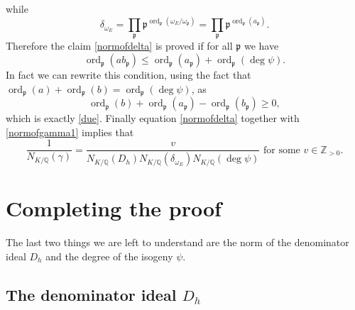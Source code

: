 \documentclass[11pt]{amsart}
\theoremstyle{definition}
\begin{document}
		while
		$$\delta_{\omega_E}=\prod_{\mathfrak{p}}{\mathfrak{p}}^{\operatorname{ord}_{\mathfrak{p}}(\omega_E/\omega_{\mathfrak{p}})}=\prod_{\mathfrak{p}}{\mathfrak{p}}^{\operatorname{ord}_{\mathfrak{p}}(a_{\mathfrak{p}})}.$$
		Therefore the claim \eqref{normofdelta} is proved if for all ${\mathfrak{p}}$ we have
		$$\operatorname{ord}_{\mathfrak{p}}(ab_{\mathfrak{p}})\leq\operatorname{ord}_{\mathfrak{p}}(a_{\mathfrak{p}})+\operatorname{ord}_{\mathfrak{p}}(\deg\psi).$$
		In fact we can rewrite this condition, using the fact that $\operatorname{ord}_{\mathfrak{p}}(a)+\operatorname{ord}_{\mathfrak{p}}(b)=\operatorname{ord}_{\mathfrak{p}}(\deg\psi)$, as
		$$\operatorname{ord}_{\mathfrak{p}}(b)+\operatorname{ord}_{\mathfrak{p}}(a_{\mathfrak{p}})-\operatorname{ord}_{\mathfrak{p}}(b_{\mathfrak{p}})\geq 0,$$
		which is exactly \eqref{due}. Finally equation \eqref{normofdelta} together with \eqref{normofgamma1} implies that
			\begin{equation}\label{normofgamma}
				\frac{1}{N_{K/{\mathbb{Q}}}(\gamma)}=\frac{v}{N_{K/{\mathbb{Q}}}(D_h)N_{K/{\mathbb{Q}}}(\delta_{\omega_E})N_{K/{\mathbb{Q}}}(\deg\psi)} \mbox{ for some } v\in {\mathbb{Z}}_{>0}.
		\end{equation}

		\section{Completing the proof}\label{finbnd}
		The last two things we are left to understand are the norm of the denominator ideal $D_h$ and the degree of the isogeny $\psi$.

		\subsection{The denominator ideal
\texorpdfstring{$D_h$}{}}
\end{document}
